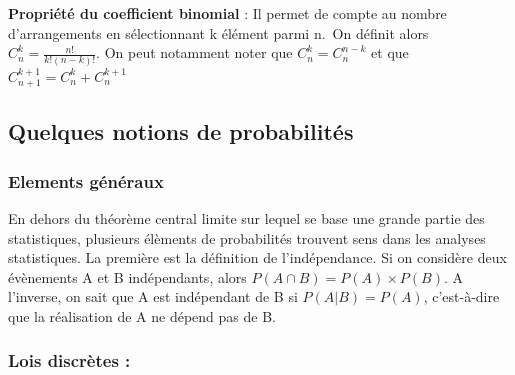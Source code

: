\documentclass[
]{article}
\begin{document}
\textbf{Propriété du coefficient binomial} : Il permet de compte au
nombre d'arrangements en sélectionnant k élément parmi n.~On définit
alors \(C^k_n=\frac{n!}{k!(n-k)!}\). On peut notamment noter que
\(C^k_n=C^{n-k}_n\) et que \(C^{k+1}_{n+1}=C^k_n+C^{k+1}_n\)

\hypertarget{quelques-notions-de-probabilituxe9s}{%
\subsection{Quelques notions de
probabilités}\label{quelques-notions-de-probabilituxe9s}}

\hypertarget{elements-guxe9nuxe9raux}{%
\subsubsection{Elements généraux}\label{elements-guxe9nuxe9raux}}

En dehors du théorème central limite sur lequel se base une grande
partie des statistiques, plusieurs élèments de probabilités trouvent
sens dans les analyses statistiques. La première est la définition de
l'indépendance. Si on considère deux évènements A et B indépendants,
alors \(P(A\cap B)=P(A)\times P(B)\). A l'inverse, on sait que A est
indépendant de B si \(P(A|B)=P(A)\), c'est-à-dire que la réalisation de
A ne dépend pas de B.

\hypertarget{lois-discruxe8tes}{%
\subsubsection{Lois discrètes :}\label{lois-discruxe8tes}}
\end{document}

